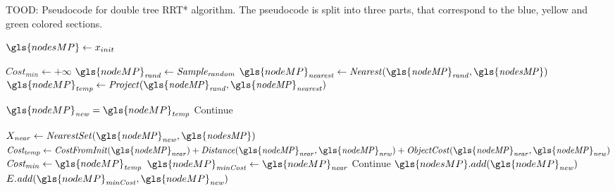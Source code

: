 \begin{algorithm}[H]
\caption{TOOD: Pseudocode for double tree \ac{RRT*} algorithm. The pseudocode is split into three parts,  that correspond to the blue, yellow and green colored sections.}%
\label{pseudocode:modified_proposed_rrt_star}
\begin{algorithmic}[1]

\hspace{-0.9cm}
\colorbox{my_grey}{\parbox{\linewidth}{%
\State $\gls{nodesMP} \leftarrow x_{init}$

\hspace{-0.1cm}\colorbox{my_light_blue}{\parbox{\linewidth}{%
    \State $Cost_\mathit{min} \leftarrow +\infty$ 
    \State $\gls{nodeMP}_\mathit{rand} \leftarrow \mathit{Sample_{random}}$
    \State $\gls{nodeMP}_\mathit{nearest} \leftarrow \mathit{Nearest(\gls{nodeMP}_{rand}, \gls{nodesMP})}$
    \State $\gls{nodeMP}_\mathit{temp} \leftarrow \mathit{Project(\gls{nodeMP}_{rand}, \gls{nodeMP}_{nearest})}$

    \State $\gls{nodeMP}_\mathit{new} = \gls{nodeMP}_\mathit{temp}$
    \Else
        \State Continue
    \EndIf
}}

\hspace{-0.1cm}\colorbox{my_yellow}{\parbox{\linewidth}{%
    \State $X_\mathit{near} \leftarrow \mathit{NearestSet(\gls{nodeMP}_{new}, \gls{nodesMP})}$ 
    \State $\mathit{Cost_{temp}} \leftarrow \mathit{CostFromInit(\gls{nodeMP}_{near}) + Distance(\gls{nodeMP}_{near}, \gls{nodeMP}_{new}) + ObjectCost(\gls{nodeMP}_{near}, \gls{nodeMP}_{new})}$
    \State $\mathit{Cost_{min}} \leftarrow \gls{nodeMP}_\mathit{temp}$
    \State $\gls{nodeMP}_\mathit{minCost} \leftarrow \gls{nodeMP}_\mathit{near}$
        \EndIf
    \EndFor
        \State Continue
    \Else
    \State $\gls{nodesMP}.add(\gls{nodeMP}_\mathit{new})$
    \State $E.\mathit{add}(\gls{nodeMP}_\mathit{minCost}, \gls{nodeMP}_\mathit{new})$
    \EndIf
}}

}}
\end{algorithmic}
\end{algorithm}
